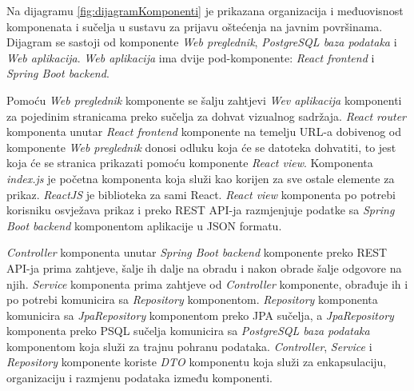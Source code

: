 			Na dijagramu \ref{fig:dijagramKomponenti} je prikazana organizacija i međuovisnost komponenata i sučelja u sustavu za prijavu oštećenja na javnim površinama. Dijagram se sastoji od komponente \textit{Web preglednik}, \textit{PostgreSQL baza podataka} i \textit{Web aplikacija}. \textit{Web aplikacija} ima dvije pod-komponente: \textit{React frontend} i \textit{Spring Boot backend}. 
			
			Pomoću \textit{Web preglednik} komponente se šalju zahtjevi \textit{Wev aplikacija} komponenti za pojedinim stranicama preko sučelja za dohvat vizualnog sadržaja. \textit{React router} komponenta unutar \textit{React frontend} komponente na temelju URL-a dobivenog od komponente \textit{Web preglednik} donosi odluku koja će se datoteka dohvatiti, to jest koja će se stranica prikazati pomoću komponente \textit{React view}. Komponenta \textit{index.js} je početna komponenta koja služi kao korijen za sve ostale elemente za prikaz. \textit{ReactJS} je biblioteka za sami React. \textit{React view} komponenta po potrebi korisniku osvježava prikaz i preko REST API-ja razmjenjuje podatke sa \textit{Spring Boot backend} komponentom aplikacije u JSON formatu.
			
			\textit{Controller} komponenta unutar \textit{Spring Boot backend} komponente preko REST API-ja prima zahtjeve, šalje ih dalje na obradu i nakon obrade šalje odgovore na njih. \textit{Service} komponenta prima zahtjeve od \textit{Controller} komponente, obrađuje ih i po potrebi komunicira sa \textit{Repository} komponentom. \textit{Repository} komponenta komunicira sa \textit{JpaRepository} komponentom preko JPA sučelja, a \textit{JpaRepository} komponenta preko PSQL sučelja komunicira sa \textit{PostgreSQL baza podataka} komponentom koja služi za trajnu pohranu podataka. \textit{Controller}, \textit{Service} i \textit{Repository} komponente koriste \textit{DTO} komponentu koja služi za enkapsulaciju, organizaciju i razmjenu podataka između komponenti.
			
